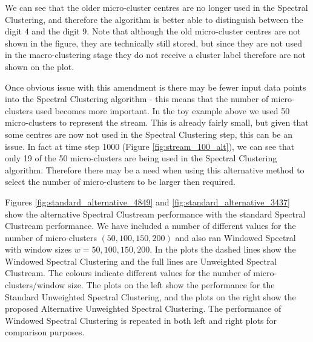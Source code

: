 We can see that the older micro-cluster centres are no longer used in the Spectral Clustering, and therefore the algorithm is better able to distinguish between the digit 4 and the digit 9. Note that although the old micro-cluster centres are not shown in the figure, they are technically still stored, but since they are not used in the macro-clustering stage they do not receive a cluster label therefore are not shown on the plot. 

Once obvious issue with this amendment is there may be fewer input data points into the Spectral Clustering algorithm - this means that the number of micro-clusters used becomes more important.  In the toy example above we used 50 micro-clusters to represent the stream. This is already fairly small, but given that some centres are now not used in the Spectral Clustering step, this can be an issue. In fact at time step 1000 (Figure \ref{fig:stream_100_alt}), we can see that only 19 of the 50 micro-clusters are being used in the Spectral Clustering algorithm. Therefore there may be a need when using this alternative method to select the number of micro-clusters to be larger then required.  

Figures \ref{fig:standard_alternative_4849} and \ref{fig:standard_alternative_3437} show the alternative Spectral Clustream performance with the standard Spectral Clustream performance. We have included a number of different values for the number of micro-clusters  $(50, 100, 150, 200)$ and also ran Windowed Spectral with window sizes $w = 50,100,150, 200$.  In the plots the dashed lines show the Windowed Spectral Clustering and the full lines are Unweighted Spectral Clustream. The colours indicate different values for the number of micro-clusters/window size. The plots on the left show the performance for the Standard Unweighted Spectral Clustering, and the plots on the right show the proposed Alternative Unweighted Spectral Clustering. The performance of Windowed Spectral Clustering is repeated in both left and right plots for comparison purposes. 

